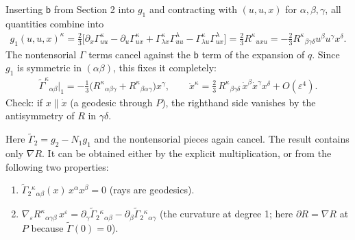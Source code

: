 \documentclass[letterpaper,10pt,english]{jupyterBook}
\begin{document}
\sphinxAtStartPar
{} Inserting \(\mathsf b\) from Section 2 into \(g_1\) and contracting with \((u,u,x)\) for \(\alpha,\beta,\gamma\), all quantities combine into
\begin{equation*}
\begin{split}
g_1(u,u,x)^\kappa=\tfrac23\Big[\partial_x\Gamma^\kappa_{uu}-\partial_u\Gamma^\kappa_{ux}+\Gamma^\kappa_{\lambda x}\Gamma^\lambda_{uu}-\Gamma^\kappa_{\lambda u}\Gamma^\lambda_{ux}\Big]=\tfrac23R^\kappa{}_{uxu}=-\tfrac23R^\kappa{}_{\beta\gamma\delta}u^\beta u^\gamma x^\delta .
\end{split}
\end{equation*}
\sphinxAtStartPar
The non\sphinxhyphen{}tensorial \(\Gamma\) terms cancel against the \(\mathsf b\) term of the expansion of \(q\). Since \(g_1\) is symmetric in \((\alpha\beta)\), this fixes it completely:
\begin{equation*}
\begin{split}
\tilde\Gamma^\kappa{}_{\alpha\beta}\Big|_{1}=-\tfrac13\big(R^\kappa{}_{\alpha\beta\gamma}+R^\kappa{}_{\beta\alpha\gamma}\big)x^\gamma ,
\qquad
\boxed{\ddot x^\kappa=\tfrac23\,R^\kappa{}_{\beta\gamma\delta}\,\dot x^\beta\dot x^\gamma x^\delta+O(\varepsilon^4)} .
\end{split}
\end{equation*}
\sphinxAtStartPar
Check: if \(x\parallel\dot x\) (a geodesic through \(P\)), the right\sphinxhyphen{}hand side vanishes by the antisymmetry of \(R\) in \(\gamma\delta\).

\sphinxAtStartPar
{} Here \(\tilde\Gamma_2=g_2-N_1g_1\) and the non\sphinxhyphen{}tensorial pieces again cancel. The result contains only \(\nabla R\). It can be obtained either by the explicit multiplication, or from the following two properties:
\begin{enumerate}
%
\item {} 
\sphinxAtStartPar
\(\tilde\Gamma_2{}^\kappa{}_{\alpha\beta}(x)\,x^\alpha x^\beta=0\) (rays are geodesics).

\item {} 
\sphinxAtStartPar
\(\nabla_\varepsilon R^\kappa{}_{\alpha\gamma\beta}\,x^\varepsilon=\partial_\gamma\tilde\Gamma_2{}^\kappa{}_{\alpha\beta}-\partial_\beta\tilde\Gamma_2{}^\kappa{}_{\alpha\gamma}\) (the curvature at degree 1; here \(\partial R=\nabla R\) at \(P\) because \(\tilde\Gamma(0)=0\)).

\end{enumerate}
\end{document}
